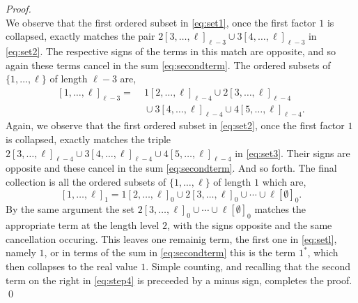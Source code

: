 \documentclass[5p,twocolumn]{elsarticle}
\begin{document}
\begin{proof}
\begin{equation}
  \end{equation}
  We observe that the first ordered subset in \eqref{eq:set1}, once the first factor $1$ is collapsed, exactly matches the pair $2[3,\ldots,\ell]_{\ell-3}\cup 3[4,\ldots,\ell]_{\ell-3}$ in \eqref{eq:set2}.
  The respective signs of the terms in this match are opposite, and so again these terms cancel in the sum \eqref{eq:secondterm}.
  The ordered subsets of $\{1,\ldots,\ell\}$ of length $\ell-3$ are,
  \begin{align}\label{eq:set3}
    [1,\ldots,\ell]_{\ell-3}=&\;1[2,\ldots,\ell]_{\ell-4}\cup 2[3,\ldots,\ell]_{\ell-4}\nonumber\\
                            &\;\cup 3[4,\ldots,\ell]_{\ell-4}\cup 4[5,\ldots,\ell]_{\ell-4}.  
  \end{align}
  Again, we observe that the first ordered subset in \eqref{eq:set2}, once the first factor $1$ is collapsed,
  exactly matches the triple $2[3,\ldots,\ell]_{\ell-4}\cup 3[4,\ldots,\ell]_{\ell-4}\cup 4[5,\ldots,\ell]_{\ell-4}$ in \eqref{eq:set3}.
  Their signs are opposite and these cancel in the sum \eqref{eq:secondterm}. And so forth. The final collection is all the ordered subsets of $\{1,\ldots,\ell\}$ of length $1$ which are,
  \begin{equation}\label{eq:setl}
    [1,\ldots,\ell]_{1}=1[2,\ldots,\ell]_{0}\cup 2[3,\ldots,\ell]_{0}\cup\cdots\cup \ell[\emptyset]_{0}. 
  \end{equation}
  By the same argument the set $2[3,\ldots,\ell]_{0}\cup\cdots\cup \ell[\emptyset]_{0}$ matches the appropriate term at the length level $2$, with the signs opposite and the same cancellation occuring.
  This leaves one remainig term, the first one in \eqref{eq:setl}, namely $1$, or in terms of the sum in \eqref{eq:secondterm} this is the term $1^\ast$, which then collapses to the real value $1$.
  Simple counting, and recalling that the second term on the right in \eqref{eq:step4} is preceeded by a minus sign, completes the proof.
\qed
\end{proof}
\end{document}

